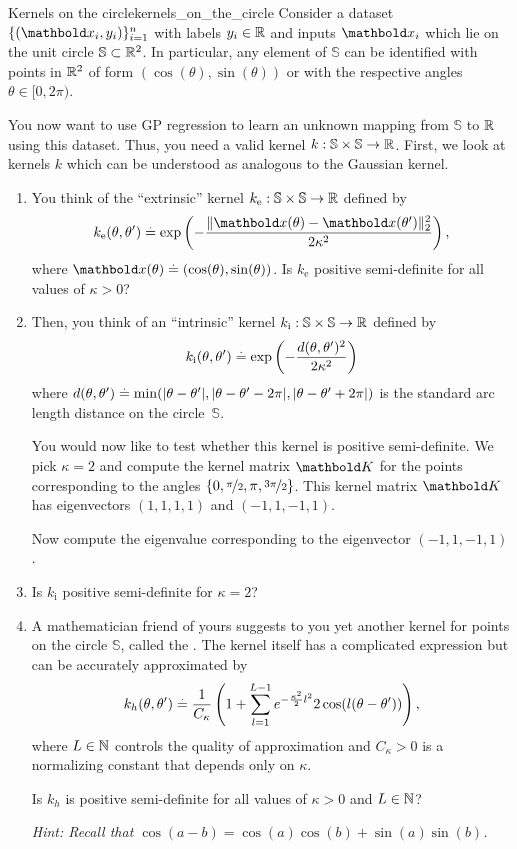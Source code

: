 \begin{nexercise}{Kernels on the circle}{kernels_on_the_circle}
  Consider a dataset $\{(\vx_i, y_i)\}_{i=1}^n$ with labels $y_i \in \mathbb{R}$ and inputs $\vx_i$ which lie on the unit circle $\mathbb{S} \subset \mathbb{R}^2$.
  In particular, any element of $\mathbb{S}$ can be identified with points in $\mathbb{R}^2$ of form $(\cos(\theta), \sin(\theta))$ or with the respective angles $\theta \in [0, 2 \pi)$.

  You now want to use GP regression to learn an unknown mapping from $\mathbb{S}$ to $\mathbb{R}$ using this dataset.
  Thus, you need a valid kernel $k: \mathbb{S} \times \mathbb{S} \to \mathbb{R}$.
  First, we look at kernels $k$ which can be understood as analogous to the Gaussian kernel.
  \begin{enumerate}
    \item You think of the ``extrinsic'' kernel $k_{\text{e}}: \mathbb{S} \times \mathbb{S} \to \mathbb{R}$ defined by
    \[
    k_{\text{e}}(\theta, \theta') \defeq \exp\left(-\frac{\|\vx(\theta)-\vx(\theta')\|_2^2}{2 \kappa^2}\right),
    \]
    where $\vx(\theta) \defeq (\cos(\theta), \sin(\theta))$.
    Is $k_{\text{e}}$ positive semi-definite for all values of $\kappa > 0$?

    \item Then, you think of an ``intrinsic'' kernel $k_{\text{i}}: \mathbb{S} \times \mathbb{S} \to \mathbb{R}$ defined by
    \[
    k_{\text{i}}(\theta, \theta') \overset{.}{=} \exp\left(-\frac{d(\theta, \theta')^2}{2 \kappa^2}\right)
    \]
    where $d(\theta, \theta') \overset{.}{=} \min(|\theta - \theta'|, |\theta - \theta' - 2 \pi|, |\theta - \theta' + 2 \pi|)$ is the standard arc length distance on the circle~$\mathbb{S}$.\par
    You would now like to test whether this kernel is positive semi-definite.
    We pick $\kappa=2$ and compute the kernel matrix $\mK$ for the points corresponding to the angles $\{0, \nicefrac{\pi}{2}, \pi, \nicefrac{3 \pi}{2} \}$.
    This kernel matrix $\mK$ has eigenvectors  $(1, 1, 1, 1)$ and $(-1, 1, -1, 1)$.\par
    Now compute the eigenvalue corresponding to the eigenvector $(-1, 1, -1, 1)$.

    \item Is $k_{\text{i}}$ positive semi-definite for $\kappa = 2$?

    \item A mathematician friend of yours suggests to you yet another kernel for points on the circle $\mathbb{S}$, called the .
    The kernel itself has a complicated expression but can be accurately approximated by
    \[
      k_h(\theta, \theta') \overset{.}{=} \frac{1}{C_{\kappa}} \left( 1 + \sum_{l=1}^{L-1} e^{-\frac{\kappa^2}{2} l^2} 2 \cos(l (\theta - \theta')) \right),
    \]
    where $L \in \mathbb{N}$ controls the quality of approximation and $C_{\kappa} > 0$ is a normalizing constant that depends only on $\kappa$.\par
    Is $k_h$ is positive semi-definite for all values of $\kappa > 0$ and $L \in \mathbb{N}$?\par
    \textit{Hint: Recall that $\cos(a - b) = \cos(a)\cos(b) + \sin(a) \sin(b)$.}
  \end{enumerate}
\end{nexercise}

